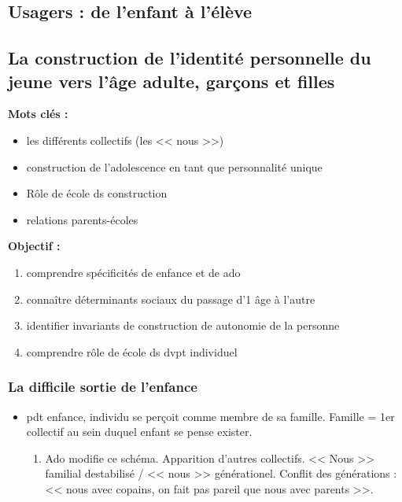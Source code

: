 \documentclass[12pt]{report}
\begin{document}
\begin{itemize}
\part{Usagers : de l'enfant à l'élève}

\chapter{La construction de l'identité personnelle du jeune vers l'âge adulte, garçons et filles}

\textbf{Mots clés : }
\begin{itemize}
\item les différents collectifs (les << nous >>)
\item construction de l'adolescence en tant que personnalité unique
\item Rôle de école ds construction
\item relations parents-écoles
\end{itemize}

\vspace{0.5cm}

\textbf{Objectif :}


\begin{enumerate}
\item comprendre spécificités de enfance et de ado
\item connaître déterminants sociaux du passage d'1 âge à l'autre
\item identifier invariants de construction de autonomie de la personne
\item comprendre rôle de école ds dvpt individuel \\
\end{enumerate}

\section{La difficile sortie de l'enfance}

\begin{itemize}
\item pdt enfance, individu se perçoit comme membre de sa famille. Famille = 1er collectif au sein duquel enfant se pense exister.
\begin{enumerate}
\item Ado modifie ce schéma. Apparition d'autres collectifs. << Nous >> familial destabilisé / << nous >> générationel. Conflit des générations : << nous avec copains, on fait pas pareil que nous avec parents >>. \\
\end{enumerate}


\end{itemize}
\end{itemize}
\end{document}

